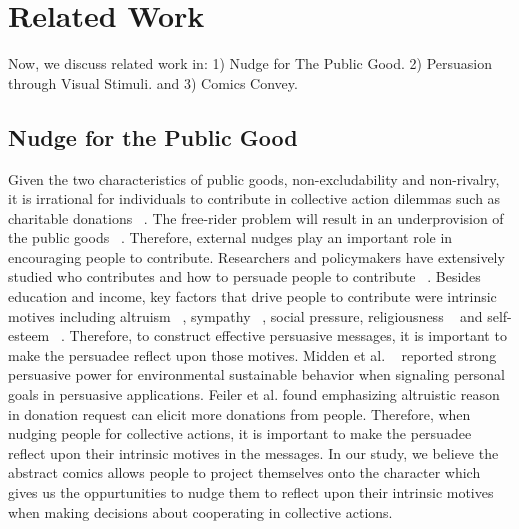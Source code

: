 \section{Related Work}
\label{sec:relatedwork}
Now, we discuss related work in: 1) Nudge for The Public Good. 2) Persuasion through Visual Stimuli. and 3) Comics Convey.

\subsection{Nudge for the Public Good}
Given the two characteristics of public goods, non-excludability and non-rivalry, it is irrational for individuals to contribute in collective action dilemmas such as charitable donations ~\textcite{MarwellandAmes1981}. The free-rider problem will result in an underprovision of the public goods ~\textcite{}. Therefore, external nudges play an important role in encouraging people to contribute. Researchers and policymakers have extensively studied who contributes and how to persuade people to contribute ~\textcite{}. Besides education and income, key factors that drive people to contribute were intrinsic motives including altruism ~\textcite{Olson1965}, sympathy ~\textcite{Becker1974}, social pressure, religiousness ~\textcite{Pessemier1977} and self-esteem ~\textcite{Burnett1981}. Therefore, to construct effective persuasive messages, it is important to make the persuadee reflect upon those motives.  Midden et al. ~\textcite{} reported strong persuasive power for environmental sustainable behavior when signaling personal goals in persuasive applications. Feiler et al. found emphasizing altruistic reason in donation request can elicit more donations from people. Therefore, when nudging people for collective actions, it is important to make the persuadee reflect upon their intrinsic motives in the messages. In our study, we believe the abstract comics allows people to project themselves onto the character which gives us the oppurtunities to nudge them to reflect upon their intrinsic motives when making decisions about cooperating in collective actions. 

